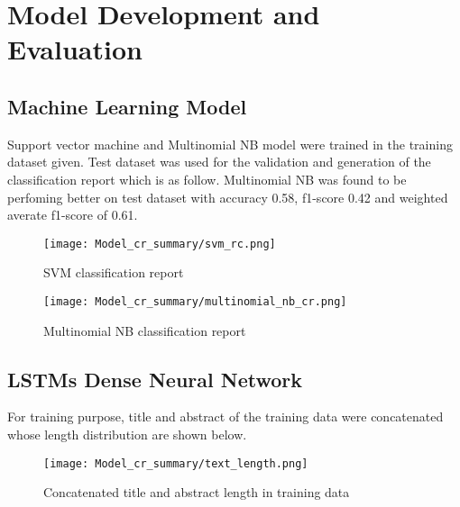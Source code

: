 \chapter{Model Development and Evaluation}
\section{Machine Learning Model}
Support vector machine and Multinomial NB model were trained in the training dataset given. Test dataset was used for the validation and generation of the classification report which is as follow. Multinomial NB was found to be perfoming better on test dataset with accuracy 0.58, f1-score 0.42 and weighted averate f1-score of 0.61.

\begin{figure}[H]
    \centering
    \texttt{[image: Model\_cr\_summary/svm\_rc.png]}
    \caption{SVM classification report}
    \label{fig:SVM classification report}
\end{figure}

\begin{figure}[H]
    \centering
    \texttt{[image: Model\_cr\_summary/multinomial\_nb\_cr.png]}
    \caption{Multinomial NB classification report}
    \label{fig:Multinomial NB classification report}
\end{figure}


\section{LSTMs Dense Neural Network}
For training purpose, title and abstract of the training data were concatenated whose length distribution are shown below.

\begin{figure}[H]
    \centering
    \texttt{[image: Model\_cr\_summary/text\_length.png]}
    \caption{Concatenated title and abstract length in training data}
    \label{fig:Concatenated title and abstract length in training data}
\end{figure}

